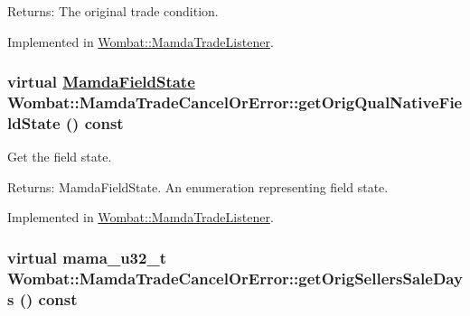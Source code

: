 \begin{Desc}
\item[Returns:]The original trade condition. \end{Desc}


Implemented in \hyperlink{classWombat_1_1MamdaTradeListener_3d7a8290418015b6f8e1bc2e412225b1}{Wombat::Mamda\-Trade\-Listener}.\hypertarget{classWombat_1_1MamdaTradeCancelOrError_9ce7c8f5f35a4a4caacf5ed43637f067}{
\subsubsection[getOrigQualNativeFieldState]{\setlength{\rightskip}{0pt plus 5cm}virtual \hyperlink{namespaceWombat_93aac974f2ab713554fd12a1fa3b7d2a}{Mamda\-Field\-State} Wombat::Mamda\-Trade\-Cancel\-Or\-Error::get\-Orig\-Qual\-Native\-Field\-State () const}}
\label{classWombat_1_1MamdaTradeCancelOrError_9ce7c8f5f35a4a4caacf5ed43637f067}


Get the field state. 

\begin{Desc}
\item[Returns:]Mamda\-Field\-State. An enumeration representing field state. \end{Desc}


Implemented in \hyperlink{classWombat_1_1MamdaTradeListener_3901e347c7b178d7c30d016180133738}{Wombat::Mamda\-Trade\-Listener}.\hypertarget{classWombat_1_1MamdaTradeCancelOrError_6df3a025f99a8d6328bcdda0fb4491f1}{
\subsubsection[getOrigSellersSaleDays]{\setlength{\rightskip}{0pt plus 5cm}virtual mama\_\-u32\_\-t Wombat::Mamda\-Trade\-Cancel\-Or\-Error::get\-Orig\-Sellers\-Sale\-Days () const}}
\label{classWombat_1_1MamdaTradeCancelOrError_6df3a025f99a8d6328bcdda0fb4491f1}


